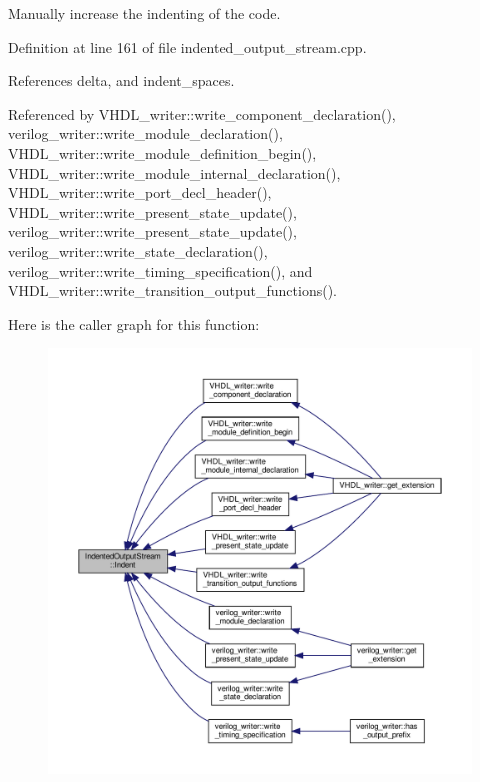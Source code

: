Manually increase the indenting of the code. 



Definition at line 161 of file indented\+\_\+output\+\_\+stream.\+cpp.



References delta, and indent\+\_\+spaces.



Referenced by V\+H\+D\+L\+\_\+writer\+::write\+\_\+component\+\_\+declaration(), verilog\+\_\+writer\+::write\+\_\+module\+\_\+declaration(), V\+H\+D\+L\+\_\+writer\+::write\+\_\+module\+\_\+definition\+\_\+begin(), V\+H\+D\+L\+\_\+writer\+::write\+\_\+module\+\_\+internal\+\_\+declaration(), V\+H\+D\+L\+\_\+writer\+::write\+\_\+port\+\_\+decl\+\_\+header(), V\+H\+D\+L\+\_\+writer\+::write\+\_\+present\+\_\+state\+\_\+update(), verilog\+\_\+writer\+::write\+\_\+present\+\_\+state\+\_\+update(), verilog\+\_\+writer\+::write\+\_\+state\+\_\+declaration(), verilog\+\_\+writer\+::write\+\_\+timing\+\_\+specification(), and V\+H\+D\+L\+\_\+writer\+::write\+\_\+transition\+\_\+output\+\_\+functions().

Here is the caller graph for this function\+:
\nopagebreak
\begin{figure}[H]
\begin{center}
\leavevmode
\includegraphics[width=350pt]{d4/d62/classIndentedOutputStream_a875a467bf36c8409e362b1c345e66f6a_icgraph}
\end{center}
\end{figure}
\mbox{\label{classIndentedOutputStream_a7af26dbbc73375326e27675b25824063}} 
